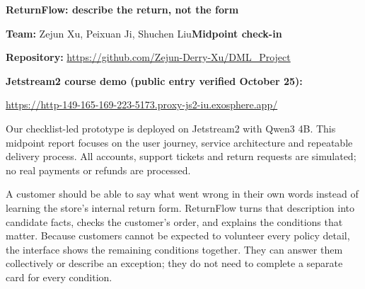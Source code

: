 \documentclass[10pt,letterpaper]{article}
\newcommand{\TeamMembers}{Zejun Xu, Peixuan Ji, Shuchen Liu}
\newcommand{\RepoURL}{https://github.com/Zejun-Derry-Xu/DML_Project}
\newcommand{\ApplicationURL}{https://http-149-165-169-223-5173.proxy-js2-iu.exosphere.app/}
\newcommand{\heading}[1]{\vspace{3pt}{\large\bfseries #1}\par\vspace{2pt}}
\newcommand{\notice}[1]{\begingroup\setlength{\fboxsep}{7pt}
\colorbox{goldwash}{\parbox{\dimexpr\linewidth-14pt\relax}{\small #1}}\endgroup\par}
\begin{document}
{\LARGE\bfseries ReturnFlow: describe the return, not the form}\par
\textbf{Team:} \TeamMembers\hfill\textbf{Midpoint check-in}\par
\textbf{Repository:} \url{\RepoURL}\par
\textbf{Jetstream2 course demo (public entry verified October 25):}\par
{\small\url{\ApplicationURL}}\par
\notice{Our checklist-led prototype is deployed on Jetstream2 with Qwen3 4B.
This midpoint report focuses on the user journey, service architecture and repeatable
delivery process. All accounts, support tickets and return requests are simulated;
no real payments or refunds are processed.}

\heading{1. Solution architecture: a conversation with a clear finish}
A customer should be able to say what went wrong in their own words instead of
learning the store's internal return form. ReturnFlow turns that description into
candidate facts, checks the customer's order, and explains the conditions that matter.
Because customers cannot be expected to volunteer every policy detail, the interface
shows the remaining conditions together. They can answer them collectively or describe
an exception; they do not need to complete a separate card for every condition.
\end{document}
